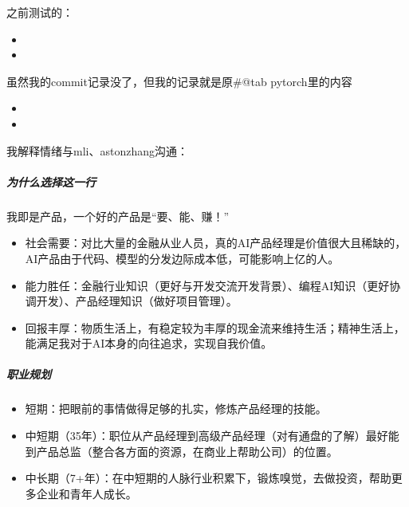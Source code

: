 \documentclass[letterpaper,10pt,english]{sphinxmanual}
\begin{document}
之前测试的：
\begin{itemize}
\item {} 

\item {} 

\end{itemize}

虽然我的commit记录没了，但我的记录就是原\#@tab pytorch里的内容
\begin{itemize}
\item {} 

\item {} 

\end{itemize}

我解释情绪与mli、astonzhang沟通：


\subparagraph{为什么选择这一行}
\label{\detokenize{chapter_interview/simulate_interview:id7}}
我即是产品，一个好的产品是“要、能、赚！”
\begin{itemize}
\item {} 
社会需要：对比大量的金融从业人员，真的AI产品经理是价值很大且稀缺的，AI产品由于代码、模型的分发边际成本低，可能影响上亿的人。

\item {} 
能力胜任：金融行业知识（更好与开发交流开发背景）、编程AI知识（更好协调开发）、产品经理知识（做好项目管理）。

\item {} 
回报丰厚：物质生活上，有稳定较为丰厚的现金流来维持生活；精神生活上，能满足我对于AI本身的向往追求，实现自我价值。

\end{itemize}


\subparagraph{职业规划}
\label{\detokenize{chapter_interview/simulate_interview:id8}}\begin{itemize}
\item {} 
短期：把眼前的事情做得足够的扎实，修炼产品经理的技能。

\item {} 
中短期（3\sphinxhyphen{}5年）：职位从产品经理到高级产品经理（对有通盘的了解）最好能到产品总监（整合各方面的资源，在商业上帮助公司）的位置。

\item {} 
中长期（7+年）：在中短期的人脉行业积累下，锻炼嗅觉，去做投资，帮助更多企业和青年人成长。

\end{itemize}
\end{document}
